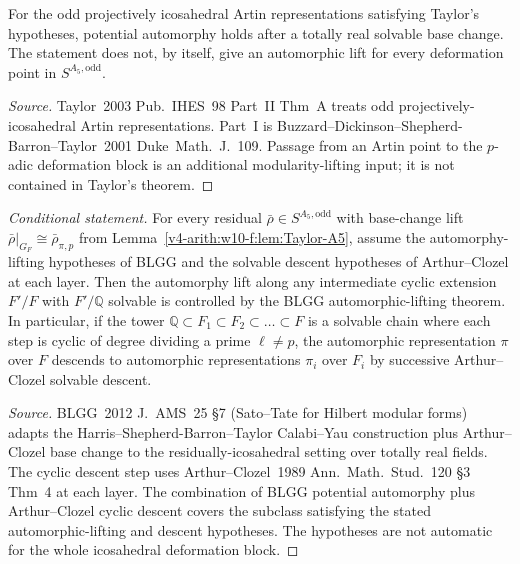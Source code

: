 \begin{lemma}
\label{v4-arith:w10-f:lem:Taylor-A5}
For the odd projectively icosahedral Artin
representations satisfying Taylor's hypotheses, potential automorphy
holds after a totally real solvable base change. The statement does
not, by itself, give an automorphic lift for every deformation point in
\(S^{A_{5},\mathrm{odd}}\).
\end{lemma}

\begin{proof}[Source]
Taylor~2003 Pub.~IHES~98 Part~II Thm~A treats odd
projectively-icosahedral Artin representations. Part~I is
Buzzard--Dickinson--Shepherd-Barron--Taylor~2001
Duke~Math.~J.~109. Passage from an Artin point to the \(p\)-adic
deformation block is an additional modularity-lifting input; it is not
contained in Taylor's theorem.
\end{proof}

\begin{lemma}
\label{v4-arith:w10-f:lem:BLGG-descent}
\emph{Conditional statement.} For every residual
\(\bar\rho\in S^{A_{5},\mathrm{odd}}\) with base-change lift
\(\bar\rho|_{G_{F}}\cong\bar\rho_{\pi,p}\) from
Lemma~\ref{v4-arith:w10-f:lem:Taylor-A5}, assume the automorphy-lifting
hypotheses of BLGG and the solvable descent hypotheses of
Arthur--Clozel at each layer. Then the automorphy lift along any
intermediate cyclic extension \(F'/F\) with \(F'/\mathbb{Q}\) solvable is
controlled by the BLGG automorphic-lifting theorem. In particular, if
the tower \(\mathbb{Q}\subset F_{1}\subset F_{2}\subset\ldots\subset F\)
is a solvable chain where each step is cyclic of degree dividing a
prime \(\ell\neq p\), the automorphic representation \(\pi\) over \(F\)
descends to automorphic representations \(\pi_{i}\) over \(F_{i}\) by
successive Arthur--Clozel solvable descent.
\end{lemma}

\begin{proof}[Source]
BLGG~2012 J.~AMS~25 \S 7 (Sato--Tate for Hilbert modular forms) adapts
the Harris--Shepherd-Barron--Taylor Calabi--Yau construction plus
Arthur--Clozel base change to the residually-icosahedral setting over
totally real fields. The cyclic descent step uses Arthur--Clozel~1989
Ann.~Math.~Stud.~120 \S 3 Thm~4 at each layer. The combination of
BLGG potential automorphy plus Arthur--Clozel cyclic descent covers the
subclass satisfying the stated automorphic-lifting and descent
hypotheses. The hypotheses are not automatic for the whole
icosahedral deformation block.
\end{proof}

